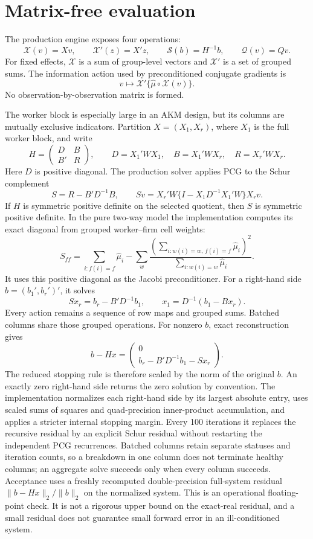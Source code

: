 \documentclass[11pt]{article}
\begin{document}
\section{Matrix-free evaluation}

The production engine exposes four operations:
\[
 \mathcal X(v)=Xv,\qquad
 \mathcal X'(z)=X'z,\qquad
 \mathcal S(b)=H^{-1}b,\qquad
 \mathcal Q(v)=Qv.
\]
For fixed effects, $\mathcal X$ is a sum of group-level vectors and
$\mathcal X'$ is a set of grouped sums.  The information action used by
preconditioned conjugate gradients is
\[
 v\longmapsto \mathcal X'\{\widehat\mu\circ\mathcal X(v)\}.
\]
No observation-by-observation matrix is formed.

The worker block is especially large in an AKM design, but its columns are
mutually exclusive indicators.  Partition $X=(X_1,X_r)$, where $X_1$ is the
full worker block, and write
\[
 H=\begin{pmatrix}D&B\\B'&R\end{pmatrix},\qquad
 D=X_1'WX_1,\quad B=X_1'WX_r,\quad R=X_r'WX_r.
\]
Here $D$ is positive diagonal.  The production solver applies PCG to the
Schur complement
\[
 S=R-B'D^{-1}B,
 \qquad
 Sv=X_r'W\{I-X_1D^{-1}X_1'W\}X_rv.
\]
If $H$ is symmetric positive definite on the selected quotient, then $S$ is
symmetric positive definite.  In the pure two-way model the implementation
computes its exact diagonal from grouped worker--firm cell weights:
\[
 S_{ff}=\sum_{i:f(i)=f}\widehat\mu_i-
 \sum_w
 \frac{\left(\sum_{i:w(i)=w,\,f(i)=f}\widehat\mu_i\right)^2}
 {\sum_{i:w(i)=w}\widehat\mu_i}.
\]
It uses this positive diagonal as the Jacobi preconditioner.
For a right-hand side $b=(b_1',b_r')'$, it solves
\[
 Sx_r=b_r-B'D^{-1}b_1,\qquad
 x_1=D^{-1}(b_1-Bx_r).
\]
Every action remains a sequence of row maps and grouped sums. Batched columns
share those grouped operations. For nonzero $b$, exact reconstruction gives
\[
 b-Hx=\begin{pmatrix}0\\b_r-B'D^{-1}b_1-Sx_r\end{pmatrix}.
\]
The reduced stopping rule is therefore scaled by the norm of the original
$b$. An exactly zero right-hand side returns the zero solution by convention.
The implementation normalizes each right-hand side by its largest absolute
entry, uses scaled sums of squares and quad-precision inner-product
accumulation, and applies a stricter internal stopping margin. Every 100
iterations it replaces the recursive residual by an explicit Schur residual
without restarting the independent PCG recurrences. Batched columns retain
separate statuses and iteration counts, so a breakdown in one column does not
terminate healthy columns; an aggregate solve succeeds only when every column
succeeds. Acceptance uses a freshly recomputed double-precision full-system
residual $\lVert b-Hx\rVert_2/\lVert b\rVert_2$ on the normalized system.
This is an operational floating-point check. It is not a rigorous upper bound
on the exact-real residual, and a small residual does not guarantee small
forward error in an ill-conditioned system.
\end{document}

